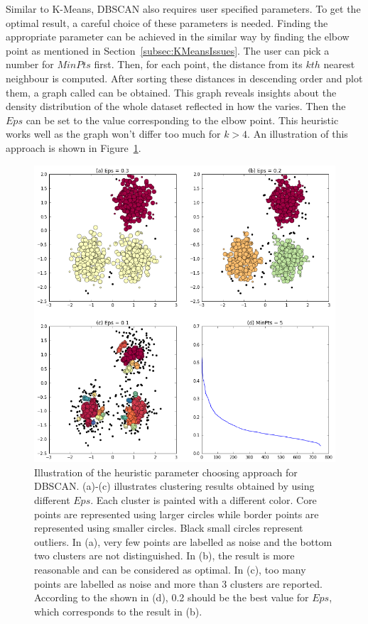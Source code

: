 Similar to K-Means, DBSCAN also requires user specified parameters. To get the optimal result, a careful choice of these parameters is needed. Finding the appropriate parameter can be achieved in the similar way by finding the elbow point as mentioned in Section~\ref{subsec:KMeansIssues}. The user can pick a number for $MinPts$ first. Then, for each point, the distance from its $kth$ nearest neighbour is computed. After sorting these distances in descending order and plot them, a graph called  can be obtained. This graph reveals insights about the density distribution of the whole dataset reflected in how the  varies. Then the $Eps$ can be set to the value corresponding to the elbow point. This heuristic works well as the graph won't differ too much for $k > 4$. An illustration of this approach is shown in Figure~\ref{fig:DBSCANParameter}.~\cite{ester1996density}

\begin{figure}
	\begin{center}
		\includegraphics[width=\textwidth]{images/DBSCANParameter.png}
		\caption{Illustration of the heuristic parameter choosing approach for DBSCAN. (a)-(c) illustrates clustering results obtained by using different $Eps$. Each cluster is painted with a different color. Core points are represented using larger circles while border points are represented using smaller circles. Black small circles represent outliers. In (a), very few points are labelled as noise and the bottom two clusters are not distinguished. In (b), the result is more reasonable and can be considered as optimal. In (c), too many points are labelled as noise and more than 3 clusters are reported. According to the  shown in (d), 0.2 should be the best value for $Eps$, which corresponds to the result in (b).}
		\label{fig:DBSCANParameter}
	\end{center}
\end{figure}